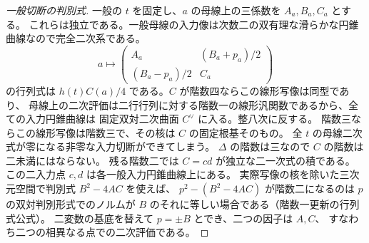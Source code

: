 \begin{proof}[一般切断の判別式]
一般の $t$ を固定し、$a$ の母線上の三係数を $A_a,B_a,C_a$ とする。
これらは独立である。一般母線の入力像は次数二の双有理な滑らかな円錐曲線なので完全二次系である。
\[
  a\longmapsto
  \begin{pmatrix} A_a &(B_a+p_a)/2\\(B_a-p_a)/2&C_a\end{pmatrix}
\]
の行列式は $h(t)C(a)/4$ である。$C$ が階数四ならこの線形写像は同型であり、
母線上の二次評価は二行行列に対する階数一の線形汎関数であるから、全ての入力円錐曲線は
固定双対二次曲面 $C^\vee$ に入る。整八次に反する。
階数三ならこの線形写像は階数三で、その核は $C$ の固定根基そのもの。
全 $t$ の母線二次式が零になる非零な入力切断ができてしまう。
$\Delta$ の階数は三なので $C$ の階数は二未満にはならない。
残る階数二では $C=c d$ が独立な二一次式の積である。
この二入力点 $c,d$ は各一般入力円錐曲線上にある。
実際写像の核を除いた三次元空間で判別式 $B^2-4AC$ を使えば、
$p^2-(B^2-4AC)$ が階数二になるのは $p$ の双対判別形式でのノルムが
$B$ のそれに等しい場合である（階数一更新の行列式公式）。
二変数の基底を替えて $p=\pm B$ とでき、二つの因子は $A,C$、
すなわち二つの相異なる点での二次評価である。
\end{proof}

